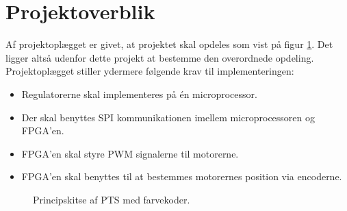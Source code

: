 \section{Projektoverblik}
\label{sec:projektoverblik}


Af projektoplægget er givet, at projektet skal opdeles som vist på 
figur \ref{fig:overview_openloop_PTS}. 
Det ligger altså udenfor dette projekt at bestemme den overordnede opdeling.
Projektoplægget stiller ydermere følgende krav til implementeringen:
\begin{itemize}
  \item Regulatorerne skal implementeres på én microprocessor.
  \item Der skal benyttes SPI kommunikationen imellem microprocessoren og FPGA’en.
  \item FPGA’en skal styre PWM signalerne til motorerne.
  \item FPGA’en skal benyttes til at bestemmes motorernes position via encoderne.
\end{itemize}

\bigskip

\begin{figure}[!th]
\centering
\begin{tikzpicture}[auto, node distance=1cm,>=latex']

\end{tikzpicture}
\caption[Principskitse af PTS]{Principskitse af PTS med farvekoder.}
\label{fig:overview_openloop_PTS}
\end{figure}

